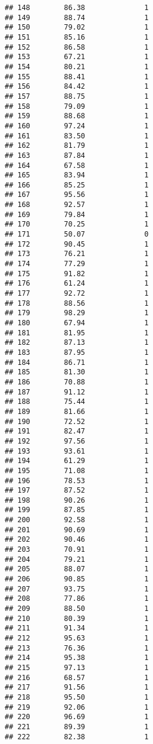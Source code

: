 \documentclass[
]{article}
\begin{document}
\begin{verbatim}
## 148        86.38              1
## 149        88.74              1
## 150        79.02              1
## 151        85.16              1
## 152        86.58              1
## 153        67.21              1
## 154        80.21              1
## 155        88.41              1
## 156        84.42              1
## 157        88.75              1
## 158        79.09              1
## 159        88.68              1
## 160        97.24              1
## 161        83.50              1
## 162        81.79              1
## 163        87.84              1
## 164        67.58              1
## 165        83.94              1
## 166        85.25              1
## 167        95.56              1
## 168        92.57              1
## 169        79.84              1
## 170        70.25              1
## 171        50.07              0
## 172        90.45              1
## 173        76.21              1
## 174        77.29              1
## 175        91.82              1
## 176        61.24              1
## 177        92.72              1
## 178        88.56              1
## 179        98.29              1
## 180        67.94              1
## 181        81.95              1
## 182        87.13              1
## 183        87.95              1
## 184        86.71              1
## 185        81.30              1
## 186        70.88              1
## 187        91.12              1
## 188        75.44              1
## 189        81.66              1
## 190        72.52              1
## 191        82.47              1
## 192        97.56              1
## 193        93.61              1
## 194        61.29              1
## 195        71.08              1
## 196        78.53              1
## 197        87.52              1
## 198        90.26              1
## 199        87.85              1
## 200        92.58              1
## 201        90.69              1
## 202        90.46              1
## 203        70.91              1
## 204        79.21              1
## 205        88.07              1
## 206        90.85              1
## 207        93.75              1
## 208        77.86              1
## 209        88.50              1
## 210        80.39              1
## 211        91.34              1
## 212        95.63              1
## 213        76.36              1
## 214        95.38              1
## 215        97.13              1
## 216        68.57              1
## 217        91.56              1
## 218        95.50              1
## 219        92.06              1
## 220        96.69              1
## 221        89.39              1
## 222        82.38              1

\end{verbatim}
\end{document}
